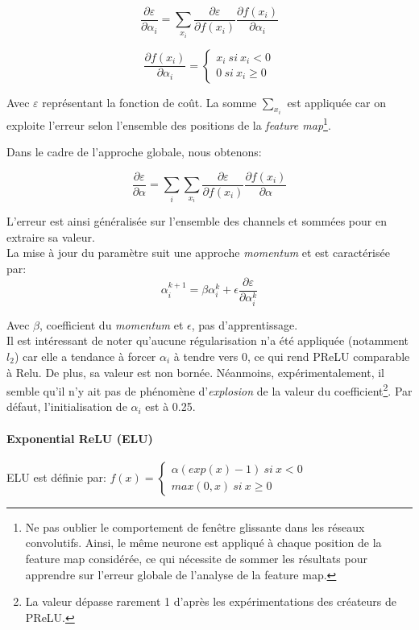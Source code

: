 $$\frac{\partial \varepsilon}{\partial \alpha_i}=\sum_{x_i}\frac{\partial \varepsilon}{\partial f(x_i)}\frac{\partial f(x_i)}{\partial \alpha_i}$$

$$\frac{\partial f(x_i)}{\partial \alpha_i}=\left\{\begin{array}{ll}x_i \ si \ x_i<0 \\0 \ si \ x_i\geq 0\end{array}\right.$$

\noindent Avec $\varepsilon$ représentant la fonction de coût. La somme $\sum_{x_i}$ est appliquée car on exploite l'erreur selon l'ensemble des positions de la \textit{feature map}\footnote{Ne pas oublier le comportement de fenêtre glissante dans les réseaux convolutifs. Ainsi, le même neurone est appliqué à chaque position de la feature map considérée, ce qui nécessite de sommer les résultats pour apprendre sur l'erreur globale de l'analyse de la feature map.}.

\noindent Dans le cadre de l'approche globale,  nous obtenons:

$$\frac{\partial \varepsilon}{\partial \alpha}=\sum_{i}\sum_{x_i}\frac{\partial \varepsilon}{\partial f(x_i)}\frac{\partial f(x_i)}{\partial \alpha}$$

\noindent L'erreur est ainsi généralisée sur l'ensemble des channels et sommées pour en extraire sa valeur.\\

\noindent La mise à jour du paramètre suit une approche \textit{momentum} et est caractérisée par:
$$\alpha_{i}^{k+1}=\beta \alpha_i^{k}+\epsilon \frac{\partial \varepsilon}{\partial \alpha_i^k}$$

\noindent Avec $\beta$, coefficient du \textit{momentum} et $\epsilon$, pas d'apprentissage. \\

\noindent Il est intéressant de noter qu'aucune régularisation n'a été appliquée (notamment $l_2$) car elle a tendance à forcer $\alpha_i$ à tendre vers 0, ce qui rend PReLU comparable à Relu. De plus, sa valeur est non bornée. Néanmoins, expérimentalement, il semble qu'il n'y ait pas de phénomène d'\textit{explosion} de la valeur du coefficient\footnote{La valeur dépasse rarement 1 d'après les expérimentations des créateurs de PReLU.}. Par défaut, l'initialisation de $\alpha_i$ est à 0.25.

\paragraph{Exponential ReLU (ELU)}
ELU\cite{elu} est définie par: $f(x)=\left\{\begin{array}{ll} \alpha(exp(x)-1) \ si \ x<0 \\max(0,x) \ si \ x\geq 0\end{array}\right.$\\

